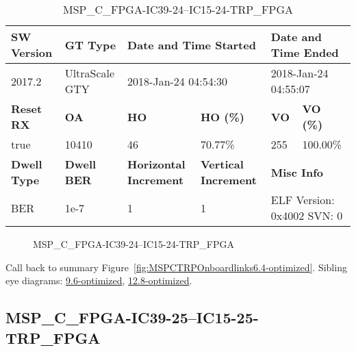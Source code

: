 \begin{table}[h]
\centering
\caption{MSP\_C\_FPGA-IC39-24--IC15-24-TRP\_FPGA}
\label{tab:MSPCFPGAIC3924IC1524TRPFPGA6.4-optimized}
\begin{tabular}{@{}|l|l|l|l|l|l|@{}}
\toprule
\textbf{SW Version}                & \textbf{GT Type}   & \multicolumn{2}{l|}{\textbf{Date and Time Started}}            & \multicolumn{2}{l|}{\textbf{Date and Time Ended}}        \\ \midrule
2017.2                       & UltraScale GTY          & \multicolumn{2}{l|}{2018-Jan-24 04:54:30}                   & \multicolumn{2}{l|}{2018-Jan-24 04:55:07}               \\ \midrule
\textbf{Reset RX}                  & \textbf{OA} & \textbf{HO}   & \textbf{HO (\%)} & \textbf{VO} & \textbf{VO (\%)} \\ \midrule
true & 10410        & 46          & 70.77\%        & 255        & 100.00\%       \\ \midrule
\textbf{Dwell Type}                & \textbf{Dwell BER} & \textbf{Horizontal Increment} & \textbf{Vertical Increment}    & \multicolumn{2}{l|}{\textbf{Misc Info}}                  \\ \midrule
BER                            & 1e-7        & 1        & 1           & \multicolumn{2}{l|}{ELF Version: 0x4002 SVN: 0}                         \\ \bottomrule
\end{tabular}
\end{table}

\begin{figure}[h]
\caption{MSP\_C\_FPGA-IC39-24--IC15-24-TRP\_FPGA} \label{fig:MSPCFPGAIC3924IC1524TRPFPGA6.4-optimized}
\end{figure}

Call back to summary Figure~\ref{fig:MSPCTRPOnboardlinks6.4-optimized}.
Sibling eye diagrams: \hyperref[sec:MSPCFPGAIC3924IC1524TRPFPGA9.6-optimized]{9.6-optimized}, \hyperref[sec:MSPCFPGAIC3924IC1524TRPFPGA12.8-optimized]{12.8-optimized}.

\clearpage
\newpage


\subsection{MSP\_C\_FPGA-IC39-25--IC15-25-TRP\_FPGA}\label{sec:MSPCFPGAIC3925IC1525TRPFPGA6.4-optimized}

